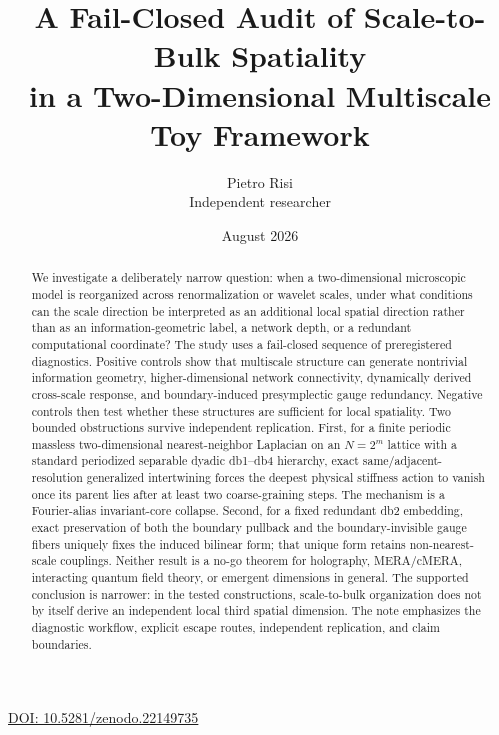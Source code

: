 \documentclass[11pt,a4paper]{article}
\title{\textbf{A Fail-Closed Audit of Scale-to-Bulk Spatiality\\in a Two-Dimensional Multiscale Toy Framework}}
\author{Pietro Risi\\Independent researcher}
\date{August 2026}
\begin{document}
\maketitle
\begin{center}
\small\href{https://doi.org/10.5281/zenodo.22149735}{DOI: 10.5281/zenodo.22149735}
\end{center}
\vspace{0.5em}

\begin{abstract}
We investigate a deliberately narrow question: when a two-dimensional microscopic model is reorganized across renormalization or wavelet scales, under what conditions can the scale direction be interpreted as an additional local spatial direction rather than as an information-geometric label, a network depth, or a redundant computational coordinate? The study uses a fail-closed sequence of preregistered diagnostics. Positive controls show that multiscale structure can generate nontrivial information geometry, higher-dimensional network connectivity, dynamically derived cross-scale response, and boundary-induced presymplectic gauge redundancy. Negative controls then test whether these structures are sufficient for local spatiality. Two bounded obstructions survive independent replication. First, for a finite periodic massless two-dimensional nearest-neighbor Laplacian on an $N=2^m$ lattice with a standard periodized separable dyadic db1--db4 hierarchy, exact same/adjacent-resolution generalized intertwining forces the deepest physical stiffness action to vanish once its parent lies after at least two coarse-graining steps. The mechanism is a Fourier-alias invariant-core collapse. Second, for a fixed redundant db2 embedding, exact preservation of both the boundary pullback and the boundary-invisible gauge fibers uniquely fixes the induced bilinear form; that unique form retains non-nearest-scale couplings. Neither result is a no-go theorem for holography, MERA/cMERA, interacting quantum field theory, or emergent dimensions in general. The supported conclusion is narrower: in the tested constructions, scale-to-bulk organization does not by itself derive an independent local third spatial dimension. The note emphasizes the diagnostic workflow, explicit escape routes, independent replication, and claim boundaries.
\end{abstract}
\end{document}
